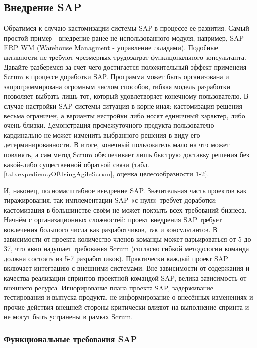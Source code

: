 \documentclass[12pt]{article}
\begin{document}
\subsection{Внедрение SAP}
Обратимся к случаю кастомизации системы SAP в процессе ее развития. Самый простой 
пример - внедрение ранее не использованного модуля, например, SAP ERP WM 
(Warehouse Managment - управление складами). Подобные активности не требуют чрезмерных 
трудозатрат функицонального консультанта. Давайте разберемся за счет чего достигается 
положительный эффект применеия Scrum в процессе доработки SAP. Программа может быть 
организована и запрограммирована огромным числом способов, гибкая модель разработки 
позволяет выбрать лишь тот, который удовлетворяет конечному пользователю. В случае 
настройки SAP-системы ситуация в корне иная: кастомизация решения весьма ограничен, 
а варианты настройки либо носят единичный характер, либо очень близки. 
Демонстрация промежуточного продукта пользователю кардинально не может изменить 
выбранного решения в виду его детерминированности. В итоге, конечный пользователь мало на что может
повлиять, а сам метод Scrum обеспечивает лишь быструю доставку решения без
какой-либо существенной обратной связи (табл. \ref{tab:expediencyOfUsingAgileScrum}, оценка целесообразности 1-2).

И, наконец, полномасштабное внедрение SAP. Значительная часть проектов как
тиражирования, так имплементации SAP «с нуля» требует доработки: кастомизация в
большинстве своём не может покрыть всех требований бизнеса. Начнём с 
организационных сложностей: проект внедрения SAP требует вовлечения большого
числа как разработчиков, так и консультантов. В зависимости от проекта количество
членов команды может варьироваться от 5 до 37, что явно нарушает требования Scrum
(согласно гибкой методологии команда должна состоять из 5-7 разработчиков).
Практически каждый проект SAP включает интеграцию с внешними системами. Вне
зависимости от содержания и качества реализации спринтов проектной командой
SAP, велика зависимость от внешнего ресурса. Игнорирование плана проекта SAP,
задерживание тестирования и выпуска продукта, не информирование о внесённых
изменениях и прочие действия внешней стороны критически влияют на выполнение
спринта и не могут быть устранены в рамках Scrum.

\subsubsection{Функциональные требования SAP} %
\end{document}
